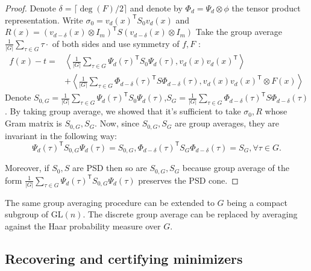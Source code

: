 \documentclass[smallextended]{svjour3}
\newcommand{\GL}{\mathrm{GL}}
\begin{document}
\begin{proof}
  Denote $\delta=\lceil\deg(F)/2\rceil$ and denote by $\Phi_{d}=\Psi_d\otimes \phi$ the tensor product representation. Write $\sigma_0 = v_d(x)^{\mathsf{T}}S_0v_d(x)$ and $R(x) = (v_{d-\delta}(x)\otimes I_m)^{\mathsf{T}} S (v_{d-\delta}(x)\otimes I_m)$ Take the group average $\frac{1}{|G|}\sum_{\tau\in G} \tau\cdot $ of both sides and use symmetry of $f,F$ : \begin{equation}
    \begin{split}
    f(x)-t =& \left\langle\frac{1}{|G|}\sum_{\tau\in G}\Psi_{d}(\tau)^{\mathsf{T}}S_0\Psi_{d}(\tau), v_d(x)v_d(x)^{\mathsf{T}}\right\rangle\\
    &+\left\langle \frac{1}{|G|}\sum_{\tau\in G}\Phi_{d-\delta}(\tau)^{\mathsf{T}}S\Phi_{d-\delta}(\tau), v_d(x)v_d(x)^{\mathsf{T}} \otimes F(x)\right\rangle
    \end{split}
  \end{equation}
  Denote $S_{0,G}=\frac{1}{|G|}\sum_{\tau\in G}\Psi_{d}(\tau)^{\mathsf{T}}S_0\Psi_{d}(\tau)$,$S_{G}=\frac{1}{|G|}\sum_{\tau\in G}\Phi_{d-\delta}(\tau)^{\mathsf{T}}S\Phi_{d-\delta}(\tau)$. By taking group average, we showed that it's sufficient to take $\sigma_0,R$ whose Gram matrix is $S_{0,G},S_{G}$. Now, since $S_{0,G},S_G$ are group averages, they are invariant in the following way: \begin{equation}
    \Psi_d(\tau)^{\mathsf{T}}S_{0,G}\Psi_d(\tau) = S_{0,G}, \Phi_{d-\delta}(\tau)^{\mathsf{T}}S_{G}\Phi_{d-\delta}(\tau)=S_{G},\forall \tau\in G.
  \end{equation}

  Moreover, if $S_0,S$ are PSD then so are $S_{0,G},S_{G}$ because group average of the form $\frac{1}{|G|}\sum_{\tau\in G} \Psi_{d}(\tau)^\mathsf{T}S_{0,G}\Psi_{d}(\tau)$ preserves the PSD cone.
\end{proof}
\begin{remark}
  The same group averaging procedure can be extended to $G$ being a compact subgroup of $\GL(n)$. The discrete group average can be replaced by averaging against the Haar probability measure over $G$.
\end{remark}

\subsection{Recovering and certifying minimizers}
\label{sec:moments}
\end{document}
